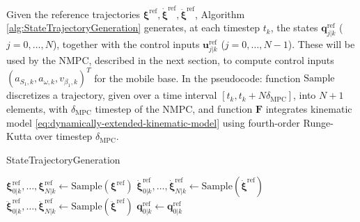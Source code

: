 Given the reference trajectories
$\bm{\xi}^{\mathrm{ref}}, \dot{\bm{\xi}}^{\mathrm{ref}}, \ddot{\bm{\xi}}^{\mathrm{ref}}$,
Algorithm \ref{alg:StateTrajectoryGeneration} generates, at each timestep
$t_k$, the states $\bm{q}_{j|k}^{\mathrm{ref}}$ ($j = 0, \dots, N$),
together with the control inputs
$\bm{u}_{j|k}^{\mathrm{ref}}$ ($j = 0, \dots, N-1$). These will be used by the
NMPC, described in the next section, to compute control inputs
$(a_{S_1, k}, a_{\omega, k}, v_{\beta_1, k})^T$ for the mobile base.
In the pseudocode: function $\mathrm{Sample}$ discretizes a trajectory,
given over a time interval $[t_k, t_{k} + N \delta_{\mathrm{MPC}}]$, into
$N + 1$ elements, with $\delta_{\mathrm{MPC}}$ timestep of the NMPC, and
function $\bm{F}$ integrates kinematic model
\eqref{eq:dynamically-extended-kinematic-model} using fourth-order Runge-Kutta
over timestep $\delta_{\mathrm{MPC}}$.%

\begin{algorithm}
\small
\caption{StateTrajectoryGeneration}
\label{alg:StateTrajectoryGeneration}
\BlankLine
$\bm{\xi}_{0|k}^{\mathrm{ref}}, \dots, \bm{\xi}_{N|k}^{\mathrm{ref}} \gets \mathrm{Sample}(\bm{\xi}^{\mathrm{ref}})$\;
$\dot{\bm{\xi}}_{0|k}^{\mathrm{ref}}, \dots, \dot{\bm{\xi}}_{N|k}^{\mathrm{ref}} \gets \mathrm{Sample}(\dot{\bm{\xi}}^{\mathrm{ref}})$\;
$\ddot{\bm{\xi}}_{0|k}^{\mathrm{ref}}, \dots, \ddot{\bm{\xi}}_{N|k}^{\mathrm{ref}} \gets \mathrm{Sample}(\ddot{\bm{\xi}}^{\mathrm{ref}})$\;
$\bm{q}_{0|k}^{\mathrm{ref}} \gets \bm{q}_{0|k}^{\mathrm{ref}}$\;
\;
\end{algorithm}


